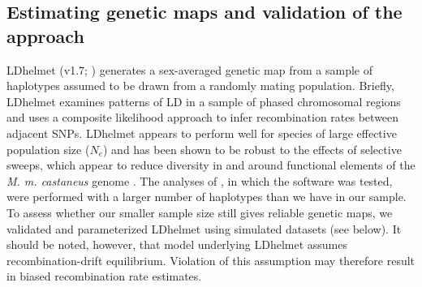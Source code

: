 \subsection{Estimating genetic maps and validation of the approach}
 
	LDhelmet (v1.7; \citealt{RN213}) generates a sex-averaged genetic map from a sample of haplotypes assumed to be drawn from a randomly mating population. Briefly, LDhelmet examines patterns of LD in a sample of phased chromosomal regions and uses a composite likelihood approach to infer recombination rates between adjacent SNPs. LDhelmet appears to perform well for species of large effective population size ($N_e$) and has been shown to be robust to the effects of selective sweeps, which appear to reduce diversity in and around functional elements of the \textit{M. m. castaneus} genome \citep{RN122}. The analyses of \cite{RN213}, in which the software was tested, were performed with a larger number of haplotypes than we have in our sample. To assess whether our smaller sample size still gives reliable genetic maps, we validated and parameterized LDhelmet using simulated datasets (see below). It should be noted, however, that model underlying LDhelmet assumes recombination-drift equilibrium. Violation of this assumption may therefore result in biased recombination rate estimates. 
 
